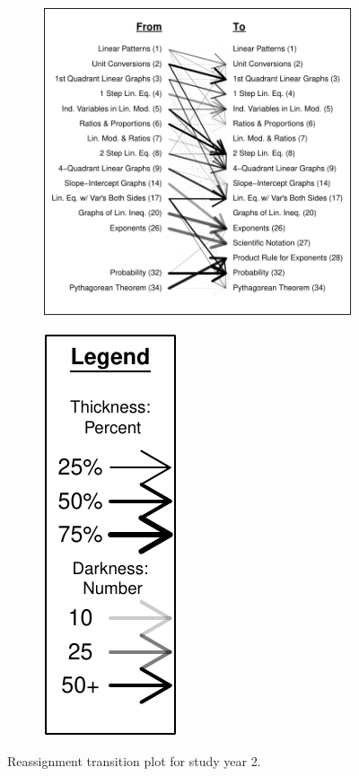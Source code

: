 \documentclass[12pt]{article}\usepackage[]{graphicx}\usepackage[]{color}
\makeatletter
\def\maxwidth{ %
  \ifdim\Gin@nat@width>\linewidth
    \linewidth
  \else
    \Gin@nat@width
  \fi
}
\makeatother
\begin{document}
\begin{figure}
  \centering
  \begin{subfigure}{5in}

\includegraphics[width=\maxwidth]{figure/transition2-1} 

\end{subfigure}
\begin{subfigure}{1in}

\includegraphics[width=\maxwidth]{figure/trans2legend-1} 

\end{subfigure}
\caption{Reassignment transition plot for study year 2.}
\label{fig:trans2}
\end{figure}
\end{document}

